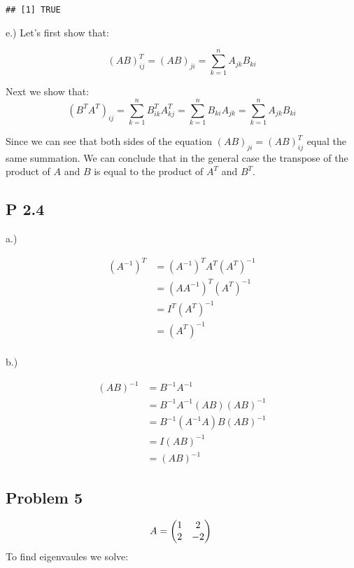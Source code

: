 \documentclass[
]{article}
\begin{document}
\begin{verbatim}
## [1] TRUE
\end{verbatim}

e.) Let's first show that:

\[
(AB)^T_{ij} = (AB)_{ji} = \sum^n_{k=1}A_{jk}B_{ki} 
\]

Next we show that: \[
(B^TA^T)_{ij}= \sum\limits_{k=1}^nB^T_{ik}A^T_{kj}= \sum\limits_{k=1}^nB_{ki}A_{jk}= \sum\limits_{k=1}^nA_{jk}B_{ki}
\]

Since we can see that both sides of the equation
\((AB)_{ji} = (AB)^T_{ij}\) equal the same summation. We can conclude
that in the general case the transpose of the product of \(A\) and \(B\)
is equal to the product of \(A^T\) and \(B^T\).

\hypertarget{p-2.4}{%
\subsection{P 2.4}\label{p-2.4}}

a.)

\begin{align*}
(A^{-1})^T &= (A^{-1})^TA^T(A^T)^{-1} \\
 &=(AA^{-1})^T(A^T)^{-1} \\
&=I^T(A^T)^{-1} \\
&= (A^T)^{-1} \\
\end{align*}

b.)

\begin{align*}
(AB)^{-1} &= B^{-1}A^{-1} \\
&= B^{-1}A^{-1}(AB)(AB)^{-1}\\
&= B^{-1}(A^{-1}A)B(AB)^{-1} \\
&= I(AB)^{-1}\\
&= (AB)^{-1}
\end{align*}

\hypertarget{problem-5}{%
\subsection{Problem 5}\label{problem-5}}

\[
A = \begin{pmatrix}
1 & 2 \\
2 & -2 \\
\end{pmatrix}\\
\] To find eigenvaules we solve:
\end{document}
